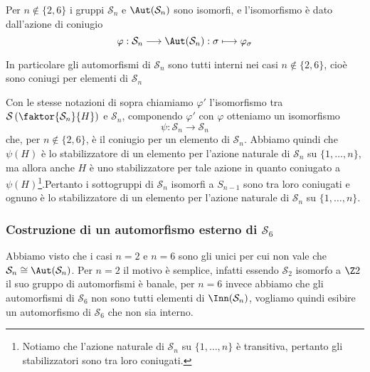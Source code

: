 \documentclass[11pt]{scrartcl}
\begin{document}
	\begin{theorem}
		Per $n \notin \{2, 6\}$ i gruppi $\mathcal{S}_n$ e $\Aut(\mathcal{S}_n)$ sono isomorfi, e 
		l'isomorfismo è dato dall'azione di coniugio
		\[
		\varphi: \mathcal{S}_n \longrightarrow \Aut(\mathcal{S}_n): \sigma \longmapsto \varphi_{\sigma}
		\]
	\end{theorem}
	
	\begin{remark}
		In particolare gli automorfismi di $\mathcal{S}_n$ sono tutti interni nei casi $n \notin \{2, 6\}$,
		cioè sono coniugi per elementi di $\mathcal{S}_n$
	\end{remark}
	
	Con le stesse notazioni di sopra chiamiamo $\varphi'$ l'isomorfismo tra
	$\mathcal{S}\left(\faktor{\mathcal{S}_n}{H}\right)$ e $\mathcal{S}_n$, componendo $\varphi'$ con $\varphi$ 
	otteniamo un isomorfismo
	\[
	\psi :\mathcal{S}_n \longrightarrow \mathcal{S}_n
	\]
	che, per $n \notin \{2, 6\}$, è il coniugio per un elemento di $\mathcal{S}_n$. Abbiamo
	quindi che $\psi(H)$ è lo stabilizzatore di un elemento per l'azione naturale
	di $\mathcal{S}_n$ su $\{1, \ldots, n\}$, ma allora anche $H$ è uno stabilizzatore per tale
	azione in quanto coniugato a $\psi(H)$\footnote{
		Notiamo che l'azione naturale di $\mathcal{S}_n$ su $\{1, \ldots, n\}$ è transitiva,
		pertanto gli stabilizzatori sono tra loro coniugati.
	}.Pertanto i sottogruppi di $\mathcal{S}_n$ isomorfi a $S_{n - 1}$ sono tra loro coniugati
	e ognuno è lo stabilizzatore di un elemento per l'azione naturale di $\mathcal{S}_n$
	su $\{1, \ldots, n\}$.
	
	\subsubsection{Costruzione di un automorfismo esterno di $\mathcal{S}_6$}
	
	Abbiamo visto che i casi $n = 2$ e $n = 6$ sono gli unici per cui non vale 
	che $\mathcal{S}_n \cong \Aut(\mathcal{S}_n)$. Per $n = 2$ il motivo è semplice, infatti essendo
	$\mathcal{S}_2$ isomorfo a $\Z2$ il suo gruppo di automorfismi è banale, per $n = 6$
	invece abbiamo che gli automorfismi di $\mathcal{S}_6$ non sono tutti elementi di $\Inn(\mathcal{S}_n)$,
	vogliamo quindi esibire un automorfismo di $\mathcal{S}_6$ che non sia interno.\newline
	
\end{document}
